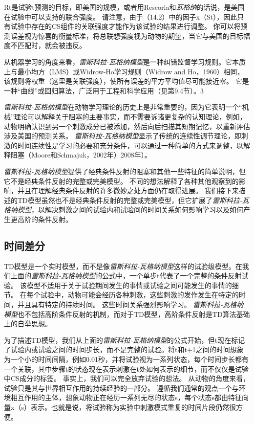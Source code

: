 {Rt是试验t预测的目标，即美国的规模，或者用Rescorla和\textit{瓦格纳}的话说，是美国在试验中可以支持的联合强度。
请注意，由于（14.2）中的因子x（St），因此只有试验中存在的CS组件的关联强度才能作为该试验的结果进行调整。
你可以将预测误差视为惊喜的衡量标准，将总联想强度视为动物的期望，当它与美国的目标幅度不匹配时，就会被违反。


从机器学习的角度来看，\textit{雷斯科拉-瓦格纳模型}是一种纠错监督学习规则。它本质上与最小均方（LMS）或Widrow-Ho学习规则（Widrow and Ho，1960）相同，该规则将权重（这里是关联强度），使所有误差的平方平均值尽可能接近零。
它是一种“曲线”或回归算法，广泛用于工程和科学应用（见第9.4节）。3


\textit{雷斯科拉-瓦格纳模型}在动物学习理论的历史上是非常重要的，因为它表明一个“机械”理论可以解释关于阻塞的主要事实，而不需要诉诸更复杂的认知理论，例如，动物明确认识到另一个刺激成分已被添加，然后向后扫描其短期记忆，以重新评估涉及美国的预测关系。
\textit{雷斯科拉-瓦格纳模型}显示了传统的连续性调节理论，即刺激的时间连续性是学习的必要和充分条件，可以通过一种简单的方式来调整，以解释阻塞（Moore和Schmajuk，2002年）2008年）。
	
	
\textit{雷斯科拉-瓦格纳模型}提供了经典条件反射的阻塞和其他一些特征的简单说明，但它不是经典条件反射的完整或完美模型。
不同的想法解释了各种其他观察到的影响，并且在理解经典条件反射的许多微妙之处方面仍在取得进展。
我们接下来描述的TD模型虽然也不是经典条件反射的完整或完美模型，但它扩展了\textit{雷斯科拉-瓦格纳模型}，以解决刺激之间的试验内和试验间的时间关系如何影响学习以及如何产生更高阶的条件反射。
	

\subsection{时间差分}

TD模型是一个实时模型，而不是像\textit{雷斯科拉-瓦格纳模型}这样的试验级模型。在我们上面的\textit{雷斯科拉-瓦格纳模型}的公式中，一个单步t代表了一个完整的条件反射试验。
该模型不适用于关于试验期间发生的事情或试验之间可能发生的事情的细节。
在每个试验中，动物可能会经历各种刺激，这些刺激的发作发生在特定的时间，并且具有特定的持续时间。
这些时间关系强烈影响学习。
\textit{雷斯科拉-瓦格纳模型}也不包括高阶条件反射的机制，而对于TD模型，高阶条件反射是TD算法基础上的自举思想。
	
	
	
为了描述TD模型，我们从上面的\textit{雷斯科拉-瓦格纳模型}的公式开始，但t现在标记了试验内或试验之间的时间步长，而不是完整的试验。将t和t+1之间的时间想象为一个小的时间间隔，例如0.01秒，并将试验视为一系列状态，每个时间步长都有一个关联，其中步骤t的状态现在表示刺激在t处如何表示的细节，而不仅仅是试验中CS成分的标签。
事实上，我们可以完全放弃试验的想法。
从动物的角度来看，试验只是其与世界相互作用的持续经验的一部分。
遵循我们通常的观点一个与环境相互作用的主体，想象动物正在经历一系列无尽的状态s，每个状态s都由特征向量x（s）表示。也就是说，将试验称为实验中刺激模式重复的时间片段仍然很方便。


}

